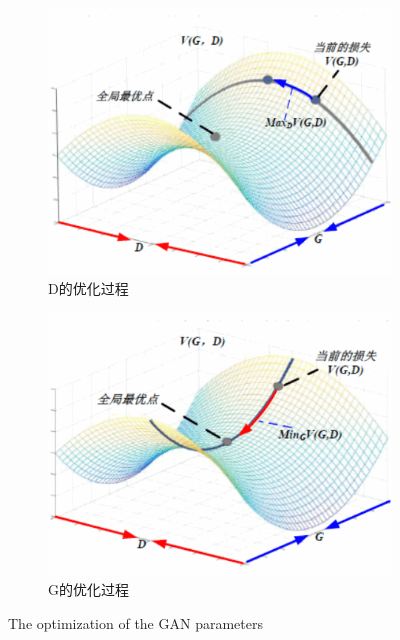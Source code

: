 \documentclass[letterpaper,12pt]{article}
\begin{document}
	\begin{figure}[htbp] 
		\centering 
		\begin{subfigure}{0.4\textwidth}
			\includegraphics[width=\linewidth]{D_optimization}
			\captionsetup{font=scriptsize}
			\caption{D的优化过程}
			\label{fig: D_optimization}
		\end{subfigure}
		\begin{subfigure}{0.4\textwidth}
			\includegraphics[width=\linewidth]{G_optimization}
			\captionsetup{font=scriptsize}
			\caption{G的优化过程}
			\label{fig: G_optimization}	
		\end{subfigure}
		\captionsetup{font=scriptsize}
		\caption{
			\label{fig: Alternate Optimization} %
			The optimization of the GAN parameters 
		}
	\end{figure}
	
\end{document}
